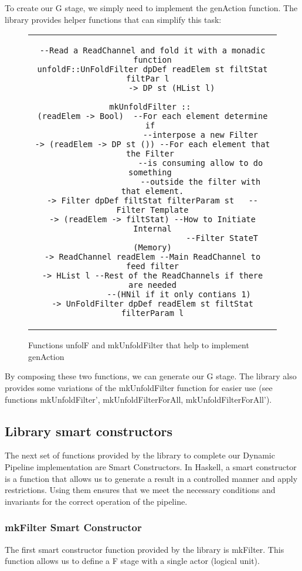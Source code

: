 To create our G stage, we simply need to implement the genAction function.
The library provides helper functions that can simplify this task:

\begin{figure}[H]
    \begin{tabular}{c}
        \begin{lstlisting}
--Read a ReadChannel and fold it with a monadic function
unfoldF::UnFoldFilter dpDef readElem st filtStat filtPar l	
        -> DP st (HList l)

mkUnfoldFilter :: 
(readElem -> Bool)  --For each element determine if 
                    --interpose a new Filter
-> (readElem -> DP st ()) --For each element that the Filter 
                    --is consuming allow to do something 
                    --outside the filter with that element.
-> Filter dpDef filtStat filterParam st   --Filter Template
-> (readElem -> filtStat) --How to Initiate Internal
                             --Filter StateT (Memory)
-> ReadChannel readElem --Main ReadChannel to feed filter
-> HList l --Rest of the ReadChannels if there are needed
           --(HNil if it only contians 1)
-> UnFoldFilter dpDef readElem st filtStat filterParam l
        \end{lstlisting}
    \end{tabular}
    \caption[{[Code]} unfoldF and mkUnfoldFilter]{Functions unfolF and mkUnfoldFilter that help to implement genAction}
    \label{fig:HC8}
\end{figure}
By composing these two functions, we can generate our G stage.
The library also provides some variations of the mkUnfoldFilter function for easier use (see functions mkUnfoldFilter', mkUnfoldFilterForAll, mkUnfoldFilterForAll').
\subsection{Library smart constructors}
The next set of functions provided by the library to complete our Dynamic Pipeline implementation are Smart Constructors.
In Haskell, a smart constructor is a function that allows us to generate a result in a controlled manner and apply restrictions.
Using them ensures that we meet the necessary conditions and invariants for the correct operation of the pipeline.
\subsubsection*{mkFilter Smart Constructor}
The first smart constructor function provided by the library is mkFilter.
This function allows us to define a F stage with a single actor (logical unit).

